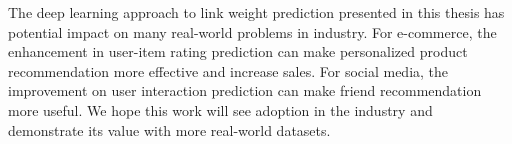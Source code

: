 \documentclass[12pt]{WSUThesis}
\theoremstyle{definition}
\begin{document}
The deep learning approach to link weight prediction presented in this thesis has potential impact on many real-world problems in industry.
For e-commerce, the enhancement in user-item rating prediction can make personalized product recommendation more effective and increase sales. For social media, the improvement on user interaction prediction can make friend recommendation more useful. We hope this work will see adoption in the industry and demonstrate its value with more real-world datasets.

\newpage

\let\WriteBookmarks\relax



\end{document}
